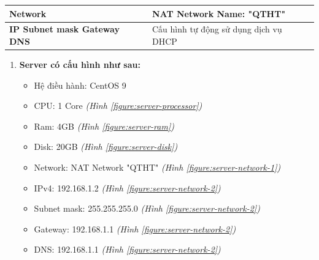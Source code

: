 \documentclass[a4paper, 11pt]{article}
\begin{document}
\begin{itemize}
\begin{minipage}{\linewidth}
\begin{multicols}{2}
\begin{minipage}{\linewidth}
\begin{tabular}{| p{.4\linewidth} | p{.5\linewidth} |}
                          \textbf{Network}                                               & NAT Network \newline Name: "QTHT"                                    \\
                          \hline

                          \textbf{IP \newline Subnet mask \newline Gateway \newline DNS} & Cấu hình tự động sử dụng dịch vụ DHCP                                \\
                          \hline
                      \end{tabular}
                  \end{minipage}
              \end{multicols}
          \end{minipage}
          \begin{enumerate}
              \item \textbf{Server có cấu hình như sau:}
                    \begin{itemize}
                        \item Hệ điều hành: CentOS 9
                        \item CPU: 1 Core \textit{(Hình \ref{figure:server-processor})}
                        \item Ram: 4GB \textit{(Hình \ref{figure:server-ram})}
                        \item Disk: 20GB \textit{(Hình \ref{figure:server-disk})}
                        \item Network: NAT Network "QTHT" \textit{(Hình \ref{figure:server-network-1})}
                        \item IPv4: 192.168.1.2 \textit{(Hình \ref{figure:server-network-2})}
                        \item Subnet mask: 255.255.255.0 \textit{(Hình \ref{figure:server-network-2})}
                        \item Gateway: 192.168.1.1 \textit{(Hình \ref{figure:server-network-2})}
                        \item DNS: 192.168.1.1 \textit{(Hình \ref{figure:server-network-2})}
                    \end{itemize}


\end{enumerate}
\end{itemize}
\end{document}
